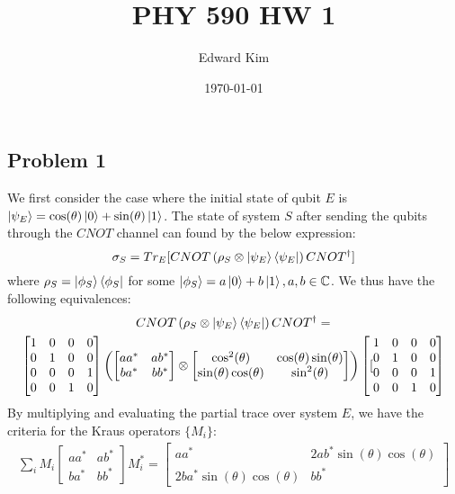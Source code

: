 \documentclass[12pt]{article}%
\begin{document}
\title{PHY 590 HW 1}
\author{Edward Kim}
\date{\today}
\maketitle

\subsection*{Problem 1}
We first consider the case where the initial state of qubit $E$ is $\ket{\psi_E} = \cos(\theta)\ket{0} + \sin(\theta)\ket{1}$. The state of system $S$ after sending the qubits through the $CNOT$ channel can found by the below expression:
$$\sigma_{S} = Tr_E[CNOT\left(\rho_S \otimes \ket{\psi_E}\bra{\psi_E} \right)CNOT^{\dagger}] $$
where $\rho_S = \ket{\phi_S}\bra{\phi_S}$ for some $\ket{\phi_S}= a\ket{0} + b\ket{1}, a,b \in \mathbb{C}$. We thus have the following equivalences:
\begin{gather*}
  CNOT\left(\rho_S \otimes \ket{\psi_E}\bra{\psi_E} \right)CNOT^{\dagger} = \\
  \left[\begin{matrix}
    1 & 0 & 0 & 0 \\
    0 & 1 & 0 & 0 \\
    0 & 0 & 0 & 1 \\
    0 & 0 & 1 & 0 \\
  \end{matrix}\right] \left(
  \left[
  \begin{matrix}
    aa^* & ab^* \\
    ba^* & bb^*
  \end{matrix}
  \right]
  \otimes
  \left[
  \begin{matrix}
    \cos^2(\theta) & \cos(\theta)\sin(\theta) \\
    \sin(\theta)\cos(\theta) & \sin^2(\theta)
  \end{matrix}
  \right]
  \right)
  \left[
  [\begin{matrix}
    1 & 0 & 0 & 0 \\
    0 & 1 & 0 & 0 \\
    0 & 0 & 0 & 1 \\
    0 & 0 & 1 & 0 \\
  \end{matrix}
  \right]
\end{gather*}
By multiplying and evaluating the partial trace over system $E$, we have the criteria for the Kraus operators $\{M_i\}$:
\begin{gather*}
  \sum_i M_i
  \left[
  \begin{matrix}
    aa^* & ab^* \\
    ba^* & bb^*
  \end{matrix}
  \right] M_i^* =   \left[\begin{matrix}
      aa^* & 2ab^*\sin(\theta)\cos(\theta) \\
      2ba^*\sin(\theta)\cos(\theta) & bb^*
    \end{matrix}\right]
\end{gather*}
\end{document}
